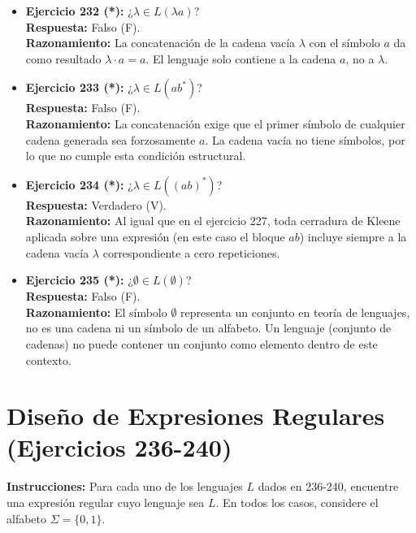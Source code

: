 \documentclass[12pt]{article}
\begin{document}
\begin{itemize}
    \vspace{0.2cm}
    \item \textbf{Ejercicio 232 (*):} ¿$\lambda \in L(\lambda a)$? \\
    \textbf{Respuesta:} Falso (F). \\
    \textbf{Razonamiento:} La concatenación de la cadena vacía $\lambda$ con el símbolo $a$ da como resultado $\lambda \cdot a = a$. El lenguaje solo contiene a la cadena $a$, no a $\lambda$.
    
    \vspace{0.2cm}
    \item \textbf{Ejercicio 233 (*):} ¿$\lambda \in L(ab^*)$? \\
    \textbf{Respuesta:} Falso (F). \\
    \textbf{Razonamiento:} La concatenación exige que el primer símbolo de cualquier cadena generada sea forzosamente $a$. La cadena vacía no tiene símbolos, por lo que no cumple esta condición estructural.
    
    \vspace{0.2cm}
    \item \textbf{Ejercicio 234 (*):} ¿$\lambda \in L((ab)^*)$? \\
    \textbf{Respuesta:} Verdadero (V). \\
    \textbf{Razonamiento:} Al igual que en el ejercicio 227, toda cerradura de Kleene aplicada sobre una expresión (en este caso el bloque $ab$) incluye siempre a la cadena vacía $\lambda$ correspondiente a cero repeticiones.
    
    \vspace{0.2cm}
    \item \textbf{Ejercicio 235 (*):} ¿$\emptyset \in L(\emptyset)$? \\
    \textbf{Respuesta:} Falso (F). \\
    \textbf{Razonamiento:} El símbolo $\emptyset$ representa un conjunto en teoría de lenguajes, no es una cadena ni un símbolo de un alfabeto. Un lenguaje (conjunto de cadenas) no puede contener un conjunto como elemento dentro de este contexto.
\end{itemize}
\section*{Diseño de Expresiones Regulares (Ejercicios 236-240)}

\textbf{Instrucciones:} Para cada uno de los lenguajes $L$ dados en 236-240, encuentre una expresión regular cuyo lenguaje sea $L$. En todos los casos, considere el alfabeto $\Sigma=\{0,1\}$.
\end{document}
